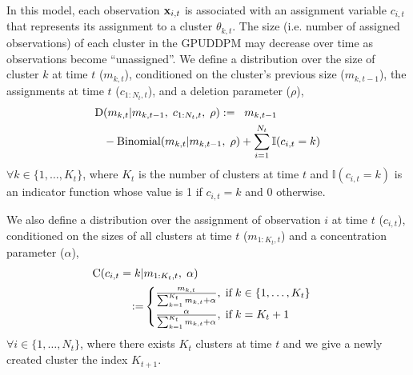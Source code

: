 \documentclass{article}
\begin{document}
In this model, each observation $\bold{x}_{i,t}$ is associated with an assignment variable $c_{i,t}$ that represents its assignment to a cluster $\theta_{k,t}$. 
The size (i.e. number of assigned observations) of each cluster in the GPUDDPM may decrease over time as observations become ``unassigned''. We define a distribution over the size of cluster $k$ at time $t$ ($m_{k,t}$), conditioned on the cluster's previous size ($m_{k,t-1}$), the assignments at time $t$ ($c_{1:N_{t}, t}$), and a deletion parameter ($\rho$),
\begin{equation}
\begin{split}
\label{D_distro}
\text{D} &(m_{k,t} | m_{k,t-1}, \hspace{1mm} c_{1:N_{t}, t}, \hspace{1mm} \rho) := \hspace{2mm} m_{k,t-1} \\
&- \text{Binomial}( m_{k,t} | {m_{k,t-1}, \hspace{1mm} \rho}) + \sum_{i=1}^{N_{t}} \mathbb{I}(c_{i,t} = k)
\end{split}
\end{equation}
$\forall k \in \{1, \ldots, K_{t} \}$, where $K_{t}$ is the number of clusters at time $t$ and $\mathbb{I}(c_{i,t} = k)$ is an indicator function whose value is 1 if $c_{i,t} = k$ and 0 otherwise.

We also define a distribution over the assignment of observation $i$ at time $t$ ($c_{i,t}$), conditioned on the sizes of all clusters at time $t$ ($m_{1:K_{t},t}$) and a concentration parameter ($\alpha$),
\begin{equation}
\begin{split}
\label{C_distro}
\text{C} ( c_{i,t} = k | &m_{1:K_{t},t}, \hspace{1mm} \alpha)\\ :=
& \begin{cases}
\frac{m_{k,t}}{\sum_{k=1}^{K_{t}} m_{k,t} + \alpha}, \hspace{1mm} \text{if} \hspace{1mm} k \in \{ 1, \ldots, K_{t} \} \\
\frac{\alpha}{\sum_{k=1}^{K_{t}} m_{k,t} + \alpha}, \hspace{1mm} \text{if} \hspace{1mm} k = K_{t} + 1
\end{cases}
\end{split}
\end{equation}
$\forall i \in \{1, \ldots, N_{t} \}$, where there exists $K_{t}$ clusters at time $t$ and we give a newly created cluster the index $K_{t+1}$.
\end{document}
